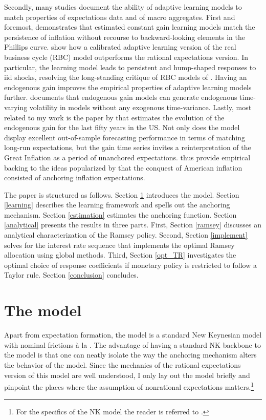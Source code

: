\documentclass[11pt]{article}
\renewcommand{\[}{\begin{equation}}
\renewcommand{\]}{\end{equation}}
\begin{document}
Secondly, many studies document the ability of adaptive learning models to match properties of expectations data and of macro aggregates. First and foremost, \cite{milani2007expectations} demonstrates that estimated constant gain learning models match the persistence of inflation without recourse to backward-looking elements in the Phillips curve. \cite{eusepi2011expectations} show how a calibrated adaptive learning version of the real business cycle (RBC) model outperforms the rational expectations version. In particular, the learning model leads to persistent and hump-shaped responses to iid shocks, resolving the long-standing critique of RBC models of \cite{cogley1993impulse}. Having an endogenous gain improves the empirical properties of adaptive learning models further. \cite{milani2014learning} documents that endogenous gain models can generate endogenous time-varying volatility  in models without any exogenous time-variance. Lastly, most related to my work is the paper by \cite{carvalho2019anchored} that estimates the evolution of the endogenous gain for the last fifty years in the US. Not only does the model display excellent out-of-sample forecasting performance in terms of matching long-run expectations, but the gain time series invites a reinterpretation of the Great Inflation as a period of unanchored expectations. \cite{carvalho2019anchored} thus provide empirical backing to the ideas popularized by \cite{sargent1999} that the conquest of American inflation consisted of anchoring inflation expectations.

The paper is structured as follows. Section \ref{NK} introduces the model. Section \ref{learning} describes the learning framework and spells out the anchoring mechanism. Section \ref{estimation} estimates the anchoring function. Section \ref{analytical} presents the results in three parts. First, Section \ref{ramsey} discusses an analytical characterization of the Ramsey policy. Second, Section \ref{implement} solves for the interest rate sequence that implements the optimal Ramsey allocation using global methods. Third, Section \ref{opt_TR} investigates the optimal choice of response coefficients if monetary policy is restricted to follow a Taylor rule.  Section \ref{conclusion} concludes.

\section{The model}\label{NK}
Apart from expectation formation, the model is a standard New Keynesian model with nominal frictions \`a la \cite{calvo1983staggered}. The advantage of having a standard NK backbone to the model is that one can neatly isolate the way the anchoring mechanism alters the behavior of the model. Since the mechanics of the rational expectations version of this model are well understood, I only lay out the model briefly and pinpoint the places where the assumption of nonrational expectations matters.\footnote{For the specifics of the NK model the reader is referred to \cite{woodford2011interest}.}
\end{document}
